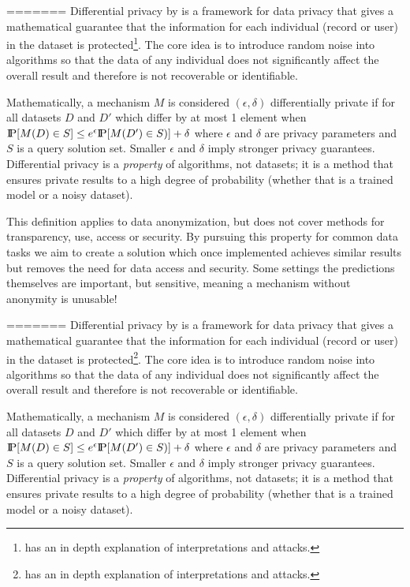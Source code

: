 \documentclass[12pt,letterpaper]{article}
\begin{document}
\begin{table}[h]
=======
Differential privacy by \cite{DworkRoth} is a framework for data privacy that gives a mathematical guarantee that the information for each individual (record or user) in the dataset is protected\footnote{\cite{DP-def} has an in depth explanation of interpretations and attacks.}. The core idea is to introduce random noise into algorithms so that the data of any individual does not significantly affect the overall result and therefore is not recoverable or identifiable. 

Mathematically, a mechanism $M$ is considered $(\epsilon, \delta)$ differentially private if for all datasets $D$ and $D'$ which differ by at most 1 element when $\P [ M(D)\in S ] \leq e^\epsilon \P [ M(D') \in S)] + \delta$ where $\epsilon$ and $\delta$ are privacy parameters and $S$ is a query solution set. Smaller $\epsilon$ and $\delta$ imply stronger privacy guarantees. Differential privacy is a \textit{property} of algorithms, not datasets; it is a method that ensures private results to a high degree of probability (whether that is a trained model or a noisy dataset). 

This definition applies to data anonymization, but does not cover methods for transparency, use, access or security. By pursuing this property for common data tasks we aim to create a solution which once implemented achieves similar results but removes the need for data access and security. Some settings the predictions themselves are important, but sensitive, meaning a mechanism without anonymity is unusable!

=======
Differential privacy by \cite{DworkRoth} is a framework for data privacy that gives a mathematical guarantee that the information for each individual (record or user) in the dataset is protected\footnote{\cite{DP-def} has an in depth explanation of interpretations and attacks.}. The core idea is to introduce random noise into algorithms so that the data of any individual does not significantly affect the overall result and therefore is not recoverable or identifiable. 

Mathematically, a mechanism $M$ is considered $(\epsilon, \delta)$ differentially private if for all datasets $D$ and $D'$ which differ by at most 1 element when $\P [ M(D)\in S ] \leq e^\epsilon \P [ M(D') \in S)] + \delta$ where $\epsilon$ and $\delta$ are privacy parameters and $S$ is a query solution set. Smaller $\epsilon$ and $\delta$ imply stronger privacy guarantees. Differential privacy is a \textit{property} of algorithms, not datasets; it is a method that ensures private results to a high degree of probability (whether that is a trained model or a noisy dataset). 


\end{table}
\end{document}
